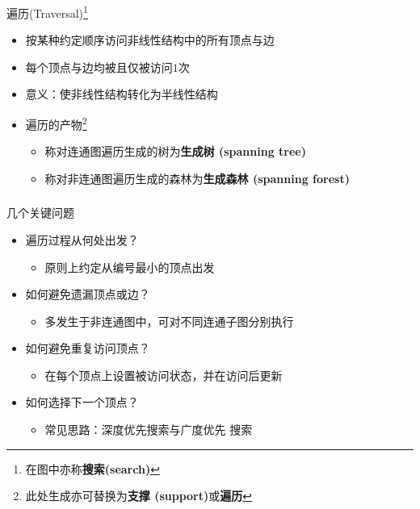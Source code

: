 \begin{frame}
    \frametitle{\insertsectionhead}
    \begin{block}{遍历(Traversal)\footnote{在图中亦称\textbf{搜索(search)}}}
        \begin{itemize}
            \item 按某种约定顺序访问非线性结构中的所有顶点与边
            \item 每个顶点与边均\alert{被且仅被}访问$1$次
            \item \alert{意义}：使非线性结构转化为半线性结构
            \item 遍历的产物\footnote{此处\alert{生成}亦可替换为\textbf{支撑
                          (support)}或\textbf{遍历}}
                  \begin{itemize}
                      \item 称对连通图遍历生成的\alert{树}为\textbf{生成树
                                (spanning tree)}
                      \item 称对非连通图遍历生成的\alert{森林}为\textbf{生成森林
                                (spanning forest)}
                  \end{itemize}
        \end{itemize}
    \end{block}
\end{frame}

\begin{frame}
    \frametitle{\insertsectionhead}
    \begin{alertblock}{几个关键问题}
        \begin{itemize}
            \item 遍历过程从何处出发？
                  \begin{itemize}
                      \item<2-> 原则上约定从编号最小的顶点出发
                  \end{itemize}
            \item 如何避免遗漏顶点或边？
                  \begin{itemize}
                      \item<3-> 多发生于非连通图中，可对不同连通子图分别执行
                  \end{itemize}
            \item 如何避免重复访问顶点？
                  \begin{itemize}
                      \item<4-> 在每个顶点上设置被访问状态，并在访问后更新
                  \end{itemize}
            \item 如何选择下一个顶点？
                  \begin{itemize}
                      \item<5-> 常见思路：\alert{深度}优先搜索与\alert{广度}优先
                          搜索
                  \end{itemize}
        \end{itemize}
    \end{alertblock}
\end{frame}

